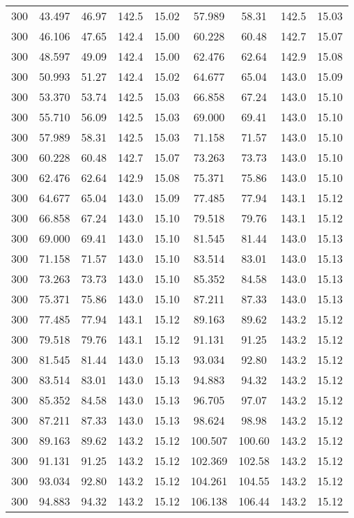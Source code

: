 \begin{table}
\begin{tabular}{c c c c c c c c c}
    300  &  43.497  &  46.97 & 142.5 & 15.02  &  57.989  &  58.31 & 142.5 & 15.03 \\
    300  &  46.106  &  47.65 & 142.4 & 15.00  &  60.228  &  60.48 & 142.7 & 15.07 \\
    300  &  48.597  &  49.09 & 142.4 & 15.00  &  62.476  &  62.64 & 142.9 & 15.08 \\
    300  &  50.993  &  51.27 & 142.4 & 15.02  &  64.677  &  65.04 & 143.0 & 15.09 \\
    300  &  53.370  &  53.74 & 142.5 & 15.03  &  66.858  &  67.24 & 143.0 & 15.10 \\
    300  &  55.710  &  56.09 & 142.5 & 15.03  &  69.000  &  69.41 & 143.0 & 15.10 \\
    300  &  57.989  &  58.31 & 142.5 & 15.03  &  71.158  &  71.57 & 143.0 & 15.10 \\
    300  &  60.228  &  60.48 & 142.7 & 15.07  &  73.263  &  73.73 & 143.0 & 15.10 \\
    300  &  62.476  &  62.64 & 142.9 & 15.08  &  75.371  &  75.86 & 143.0 & 15.10 \\
    300  &  64.677  &  65.04 & 143.0 & 15.09  &  77.485  &  77.94 & 143.1 & 15.12 \\
    300  &  66.858  &  67.24 & 143.0 & 15.10  &  79.518  &  79.76 & 143.1 & 15.12 \\
    300  &  69.000  &  69.41 & 143.0 & 15.10  &  81.545  &  81.44 & 143.0 & 15.13 \\
    300  &  71.158  &  71.57 & 143.0 & 15.10  &  83.514  &  83.01 & 143.0 & 15.13 \\
    300  &  73.263  &  73.73 & 143.0 & 15.10  &  85.352  &  84.58 & 143.0 & 15.13 \\
    300  &  75.371  &  75.86 & 143.0 & 15.10  &  87.211  &  87.33 & 143.0 & 15.13 \\
    300  &  77.485  &  77.94 & 143.1 & 15.12  &  89.163  &  89.62 & 143.2 & 15.12 \\
    300  &  79.518  &  79.76 & 143.1 & 15.12  &  91.131  &  91.25 & 143.2 & 15.12 \\
    300  &  81.545  &  81.44 & 143.0 & 15.13  &  93.034  &  92.80 & 143.2 & 15.12 \\
    300  &  83.514  &  83.01 & 143.0 & 15.13  &  94.883  &  94.32 & 143.2 & 15.12 \\
    300  &  85.352  &  84.58 & 143.0 & 15.13  &  96.705  &  97.07 & 143.2 & 15.12 \\
    300  &  87.211  &  87.33 & 143.0 & 15.13  &  98.624  &  98.98 & 143.2 & 15.12 \\
    300  &  89.163  &  89.62 & 143.2 & 15.12  & 100.507  & 100.60 & 143.2 & 15.12 \\
    300  &  91.131  &  91.25 & 143.2 & 15.12  & 102.369  & 102.58 & 143.2 & 15.12 \\
    300  &  93.034  &  92.80 & 143.2 & 15.12  & 104.261  & 104.55 & 143.2 & 15.12 \\
    300  &  94.883  &  94.32 & 143.2 & 15.12  & 106.138  & 106.44 & 143.2 & 15.12 \\

    \bottomrule
    \end{tabular}
\end{table}

